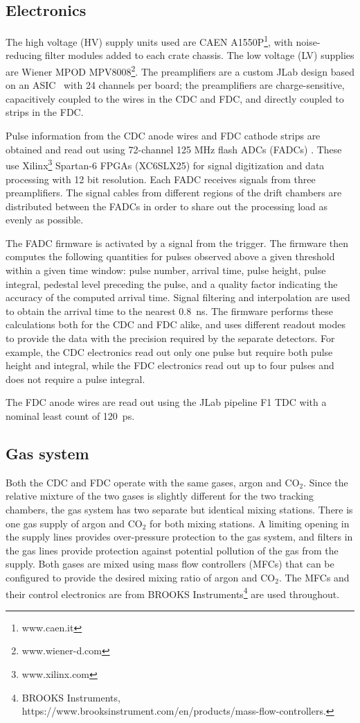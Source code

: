 \subsection{Electronics \label{sec:dcelectronics}}
The high voltage (HV) supply units used are CAEN A1550P\footnote{www.caen.it}, with noise-reducing filter modules added to each crate chassis. 
The low voltage (LV) supplies are Wiener MPOD MPV8008\footnote{www.wiener-d.com}. 
The preamplifiers are a custom JLab design based on an ASIC~\cite{hdnote2515}
with 24 channels per board; the preamplifiers are charge-sensitive, capacitively coupled to the wires in the CDC and FDC, and directly coupled to strips in the FDC. 

Pulse information from the CDC anode wires and FDC cathode strips are obtained and read out using 72-channel 125 MHz flash ADCs (FADCs) \cite{Visser2008,5873864}. These use Xilinx\footnote{www.xilinx.com} Spartan-6 FPGAs (XC6SLX25) for signal digitization and data processing with 12 bit resolution.
Each FADC receives signals from three preamplifiers. 
The signal cables from different regions of the drift chambers are distributed between the FADCs in order to share out the processing load as evenly as possible.  

The FADC firmware is activated by a signal from the \gx{} trigger. The firmware then computes the following quantities for pulses observed above a given threshold within a given time window: pulse number, arrival time, pulse height, pulse integral, pedestal level preceding the pulse, and a quality factor indicating the accuracy of the computed arrival time. 
Signal filtering and interpolation are used to obtain the arrival time to the nearest 0.8~ns. 
The firmware performs these calculations both for the CDC and FDC alike, and uses different readout modes to provide the data with the precision required by the separate detectors. 
For example, the CDC electronics read out only one pulse but require both pulse height and integral, while the FDC electronics read out up to four pulses and does not require a pulse integral.  

The FDC anode wires are read out using the JLab pipeline F1 TDC\cite{hdnote1021} with a nominal least count of 120~ps. 

\subsection[Gas system]{Gas system \label{sec:gas}}
Both the CDC and FDC operate with the same gases, argon and CO$_{2}$. Since the relative mixture of
the two gases is slightly different for the two tracking chambers, the gas system has two separate but identical mixing stations. There is one gas supply of argon and CO$_{2}$ for both mixing stations. A limiting opening in the supply
lines provides over-pressure protection to the gas system, and filters in the gas lines provide protection against potential
pollution of the gas from the supply. Both gases are mixed using mass flow controllers (MFCs) that can be 
configured
to provide the desired mixing ratio of argon and CO$_{2}$.  The MFCs and their control electronics are from
BROOKS Instruments\footnote{BROOKS Instruments, https://www.brooksinstrument.com/en/products/mass-flow-controllers.} are used throughout.

